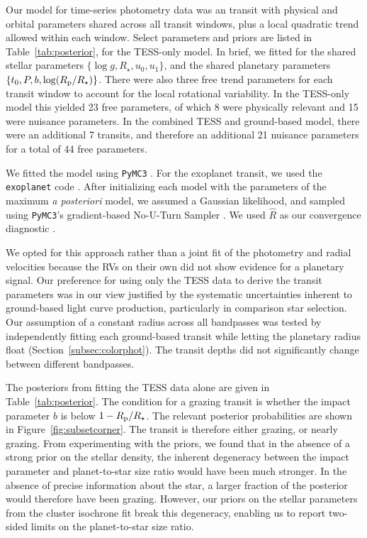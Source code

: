 \documentclass[12pt,twocolumn,tighten]{aastex63}
\begin{document}
Our model for time-series photometry data was an
\citet{exoplanet:agol19} transit with physical and orbital parameters
shared across all transit windows, plus a local quadratic trend
allowed within each window.  Select parameters and priors are listed
in Table~\ref{tab:posterior}, for the TESS-only model.  In brief, we
fitted for the shared stellar parameters $\{\log g, R_\star, u_0,
u_1\}$, and the shared planetary parameters $\{t_0, P, b, \log(R_{\rm
p}/R_\star)\}$.  There were also three free trend parameters for each
transit window to account for the local rotational variability.  In
the TESS-only model this yielded 23 free parameters, of which 8 were
physically relevant and 15 were nuisance parameters.  In the combined
TESS and ground-based model, there were an additional 7 transits, and
therefore an additional 21 nuisance parameters for a total of 44 free
parameters.

We fitted the model using \texttt{PyMC3}
\citep{salvatier_2016_PyMC3,exoplanet:theano}.  For the exoplanet
transit, we used the \texttt{exoplanet} code
\citep{exoplanet:exoplanet}.  After initializing each model with the
parameters of the maximum {\it a posteriori} model, we assumed a
Gaussian likelihood, and sampled using \texttt{PyMC3}'s gradient-based
No-U-Turn Sampler \citep{hoffman_no-u-turn_2014}. We used $\hat{R}$ as
our convergence diagnostic \citep{gelman_inference_1992}.

We opted for this approach rather than a joint fit of the photometry
and radial velocities because the RVs on their own did not show
evidence for a planetary signal.  Our preference for using only the
TESS data to derive the transit parameters was in our view justified
by the systematic uncertainties inherent to ground-based light curve
production, particularly in comparison star selection.  Our assumption
of a constant radius across all bandpasses was tested by independently
fitting each ground-based transit while letting the planetary radius
float (Section~\ref{subsec:colorphot}). The transit depths did not
significantly change between different bandpasses.

The posteriors from fitting the TESS data alone are given in
Table~\ref{tab:posterior}.  The condition for a grazing transit is
whether the impact parameter $b$ is below $1 - R_{\rm p}/R_\star$.
The relevant posterior probabilities are shown in
Figure~\ref{fig:subsetcorner}.  The transit is therefore either
grazing, or nearly grazing.  From experimenting with the priors, we
found that in the absence of a strong prior on the stellar density,
the inherent degeneracy between the impact parameter and
planet-to-star size ratio would have been much stronger.  In the
absence of precise information about the star, a larger fraction of
the posterior would therefore have been grazing.  However, our priors
on the stellar parameters from the cluster isochrone fit break this
degeneracy, enabling us to report two-sided limits on the
planet-to-star size ratio.
\end{document}
